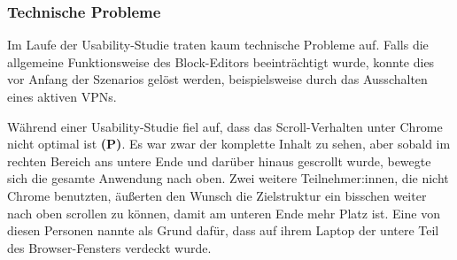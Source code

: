\subsubsection{Technische Probleme}
Im Laufe der Usability-Studie traten kaum technische Probleme auf. Falls die allgemeine Funktionsweise des Block-Editors beeinträchtigt wurde, konnte dies vor Anfang der Szenarios gelöst werden, beispielsweise durch das Ausschalten eines aktiven \acs{VPN}s.

Während einer Usability-Studie fiel auf, dass das Scroll-Verhalten unter Chrome nicht optimal ist \textbf{(P)}. Es war zwar der komplette Inhalt zu sehen, aber sobald im rechten Bereich ans untere Ende und darüber hinaus gescrollt wurde, bewegte sich die gesamte Anwendung nach oben. Zwei weitere Teilnehmer:innen, die nicht Chrome benutzten, äußerten den Wunsch die Zielstruktur ein bisschen weiter nach oben scrollen zu können, damit am unteren Ende mehr Platz ist. Eine von diesen Personen nannte als Grund dafür, dass auf ihrem Laptop der untere Teil des Browser-Fensters verdeckt wurde.
